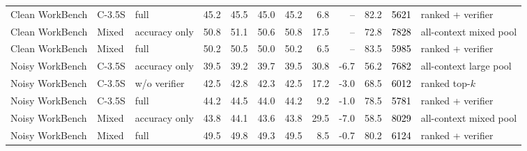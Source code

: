 \begin{longtable}{lllrrrrrrrrl}
\rowcolor{tracesoft}
Clean WorkBench & C-3.5S & full \tracescore{} & 45.2 & 45.5 & 45.0 & 45.2 & 6.8 & -- & 82.2 & \textcolor{black}{5621} & ranked + verifier \\
Clean WorkBench & Mixed & accuracy only & 50.8 & 51.1 & 50.6 & 50.8 & 17.5 & -- & 72.8 & \textcolor{black}{7828} & all-context mixed pool \\
\rowcolor{tracesoft}
Clean WorkBench & Mixed & full \tracescore{} & 50.2 & 50.5 & 50.0 & 50.2 & 6.5 & -- & 83.5 & \textcolor{black}{5985} & ranked + verifier \\
\midrule
Noisy WorkBench & C-3.5S & accuracy only & 39.5 & 39.2 & 39.7 & 39.5 & 30.8 & -6.7 & 56.2 & \textcolor{black}{7682} & all-context large pool \\
Noisy WorkBench & C-3.5S & \tracescore{} w/o verifier & 42.5 & 42.8 & 42.3 & 42.5 & 17.2 & -3.0 & 68.5 & \textcolor{black}{6012} & ranked top-$k$ \\
\rowcolor{tracesoft}
Noisy WorkBench & C-3.5S & full \tracescore{} & 44.2 & 44.5 & 44.0 & 44.2 & 9.2 & -1.0 & 78.5 & \textcolor{black}{5781} & ranked + verifier \\
Noisy WorkBench & Mixed & accuracy only & 43.8 & 44.1 & 43.6 & 43.8 & 29.5 & -7.0 & 58.5 & \textcolor{black}{8029} & all-context mixed pool \\
\rowcolor{tracesoft}
Noisy WorkBench & Mixed & full \tracescore{} & 49.5 & 49.8 & 49.3 & 49.5 & 8.5 & -0.7 & 80.2 & \textcolor{black}{6124} & ranked + verifier \\
\end{longtable}
\endgroup
